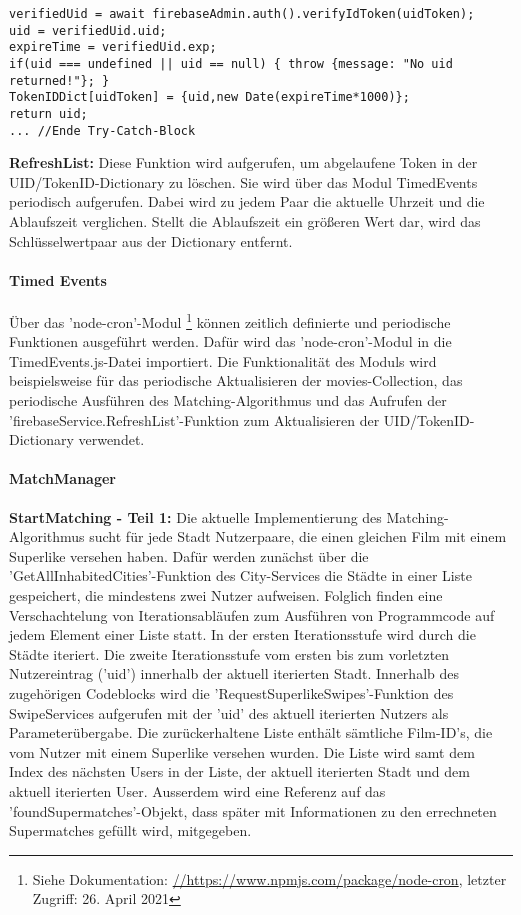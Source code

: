 \begin{lstlisting}[caption=Firebase-Service Register, label=lst:firebaseServiceRegister]
verifiedUid = await firebaseAdmin.auth().verifyIdToken(uidToken);
uid = verifiedUid.uid;
expireTime = verifiedUid.exp;
if(uid === undefined || uid == null) { throw {message: "No uid returned!"}; }
TokenIDDict[uidToken] = {uid,new Date(expireTime*1000)};
return uid;
... //Ende Try-Catch-Block
\end{lstlisting}
   
\noindent
\textbf{RefreshList:}
Diese Funktion wird aufgerufen, um abgelaufene Token in der UID/TokenID-Dictionary zu löschen. Sie wird über das Modul TimedEvents periodisch aufgerufen. Dabei wird zu jedem Paar die aktuelle Uhrzeit und die Ablaufszeit verglichen. Stellt die Ablaufszeit ein größeren Wert dar, wird das Schlüsselwertpaar aus der Dictionary entfernt.\\

\paragraph{Timed Events}
Über das 'node-cron'-Modul \footnote{Siehe Dokumentation: \url{//https://www.npmjs.com/package/node-cron}, letzter Zugriff: 26. April 2021}
können zeitlich definierte und periodische Funktionen ausgeführt werden. Dafür wird das 'node-cron'-Modul in die TimedEvents.js-Datei importiert. Die Funktionalität des Moduls wird beispielsweise für das periodische Aktualisieren der movies-Collection, das periodische Ausführen des Matching-Algorithmus und das Aufrufen der 'firebaseService.RefreshList'-Funktion zum Aktualisieren der UID/TokenID-Dictionary verwendet.\\

\paragraph{MatchManager}
\noindent
\textbf{StartMatching - Teil 1:}
Die aktuelle Implementierung des Matching-Algorithmus sucht für jede Stadt Nutzerpaare, die einen gleichen Film mit einem Superlike versehen haben. Dafür werden zunächst über die 'GetAllInhabitedCities'-Funktion des City-Services die Städte in einer Liste gespeichert, die mindestens zwei Nutzer aufweisen. Folglich finden eine Verschachtelung von Iterationsabläufen zum Ausführen von Programmcode auf jedem Element einer Liste statt.
In der ersten Iterationsstufe wird durch die Städte iteriert.
Die zweite Iterationsstufe vom ersten bis zum vorletzten Nutzereintrag ('uid') innerhalb der aktuell iterierten Stadt. Innerhalb des zugehörigen Codeblocks wird die 'RequestSuperlikeSwipes'-Funktion des SwipeServices aufgerufen mit der 'uid' des aktuell iterierten Nutzers als Parameterübergabe. Die zurückerhaltene Liste enthält sämtliche Film-ID's, die vom Nutzer mit einem Superlike versehen wurden. Die Liste wird samt dem Index des nächsten Users in der Liste, der aktuell iterierten Stadt und dem aktuell iterierten User. Ausserdem wird eine Referenz auf das 'foundSupermatches'-Objekt, dass später mit Informationen zu den errechneten Supermatches gefüllt wird, mitgegeben.\\

